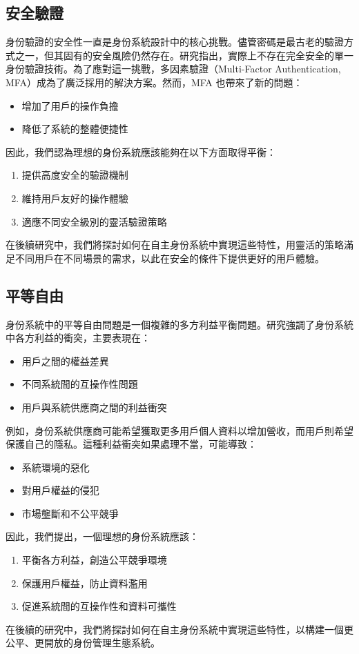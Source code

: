 \subsection{安全驗證}
身份驗證的安全性一直是身份系統設計中的核心挑戰。儘管密碼是最古老的驗證方式之一，但其固有的安全風險仍然存在。研究\cite{6234436}指出，實際上不存在完全安全的單一身份驗證技術。為了應對這一挑戰，多因素驗證（Multi-Factor Authentication, MFA）成為了廣泛採用的解決方案。然而，MFA 也帶來了新的問題：
\begin{itemize}
  \item 增加了用戶的操作負擔
  \item 降低了系統的整體便捷性
\end{itemize}
因此，我們認為理想的身份系統應該能夠在以下方面取得平衡：
\begin{enumerate}
  \item 提供高度安全的驗證機制
  \item 維持用戶友好的操作體驗
  \item 適應不同安全級別的靈活驗證策略
\end{enumerate}
在後續研究中，我們將探討如何在自主身份系統中實現這些特性，用靈活的策略滿足不同用戶在不同場景的需求，以此在安全的條件下提供更好的用戶體驗。
\subsection{平等自由}
身份系統中的平等自由問題是一個複雜的多方利益平衡問題。研究\cite{preukschat2021self}強調了身份系統中各方利益的衝突，主要表現在：
\begin{itemize}
  \item 用戶之間的權益差異
  \item 不同系統間的互操作性問題
  \item 用戶與系統供應商之間的利益衝突
\end{itemize}
例如，身份系統供應商可能希望獲取更多用戶個人資料以增加營收，而用戶則希望保護自己的隱私。這種利益衝突如果處理不當，可能導致：
\begin{itemize}
  \item 系統環境的惡化
  \item 對用戶權益的侵犯
  \item 市場壟斷和不公平競爭
\end{itemize}
因此，我們提出，一個理想的身份系統應該：
\begin{enumerate}
  \item 平衡各方利益，創造公平競爭環境
  \item 保護用戶權益，防止資料濫用
  \item 促進系統間的互操作性和資料可攜性
\end{enumerate}
在後續的研究中，我們將探討如何在自主身份系統中實現這些特性，以構建一個更公平、更開放的身份管理生態系統。
